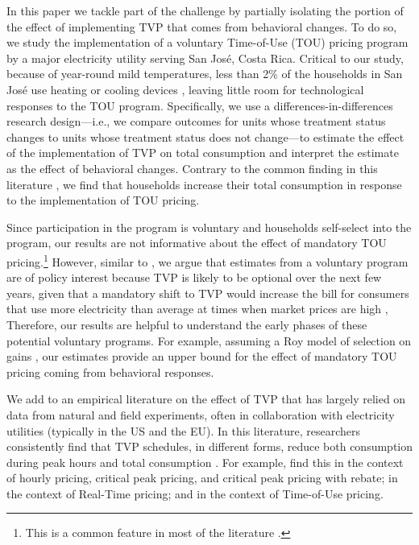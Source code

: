 \documentclass[12pt]{article}
\begin{document}
In this paper we tackle part of the challenge by partially isolating the portion of the effect of implementing TVP that comes from behavioral changes. To do so, we study the implementation of a voluntary Time-of-Use (TOU) pricing program by a major electricity utility serving San José, Costa Rica. Critical to our study, because of year-round mild temperatures, less than 2\% of the households in San José use heating or cooling devices \citep{ministeriodeambienteyenergiaEstudioParaCaracterizacion2019}, leaving little room for technological responses to the TOU program. Specifically, we use a differences-in-differences research design---i.e., we compare outcomes for units whose treatment status changes to units whose treatment status does not change---to estimate the effect of the implementation of TVP on total consumption and interpret the estimate as the effect of behavioral changes. Contrary to the common finding in this literature \citep{faruquiHouseholdResponseDynamic2010,minabadtke-berkowPrimerTimevariantElectricity2015,duttaLiteratureReviewDynamic2017}, we find that households increase their total consumption in response to the implementation of TOU pricing.

Since participation in the program is voluntary and households self-select into the program, our results are not informative about the effect of mandatory TOU pricing.\footnote{This is a common feature in most of the literature \citep{faruquiHouseholdResponseDynamic2010,minabadtke-berkowPrimerTimevariantElectricity2015}.} However, similar to \citet{allcottRethinkingRealtimeElectricity2011}, we argue that estimates from a voluntary program are of policy interest because TVP is likely to be optional over the next few years, given that a mandatory shift to TVP would increase the bill for consumers that use more electricity than average at times when market prices are high \citep{borensteinWealthTransfersLarge2007},  Therefore, our results are helpful to understand the early phases of these potential voluntary programs. For example, assuming a Roy model of selection on gains \citep{heckmanChapter70Econometric2007}, our estimates provide an upper bound for the effect of mandatory TOU pricing coming from behavioral responses.

We add to an empirical literature on the effect of TVP that has largely relied on data from natural and field experiments, often in collaboration with electricity utilities (typically in the US and the EU). In this literature, researchers consistently find that TVP schedules, in different forms, reduce both consumption during peak hours and total consumption \citep{faruquiHouseholdResponseDynamic2010,minabadtke-berkowPrimerTimevariantElectricity2015}. For example, \citet{wolakResidentialCustomersRespond2011} find this in the context of hourly pricing, critical peak pricing, and critical peak pricing with rebate; \citet{allcottRethinkingRealtimeElectricity2011} in the context of Real-Time pricing; and \citet{jessoeUnderstandingRolePrice2014} in the context of Time-of-Use pricing.
\end{document}
